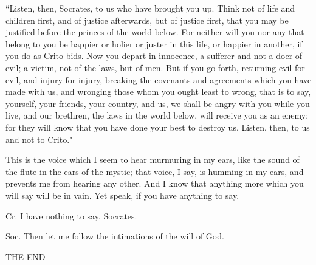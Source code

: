 ``Listen, then, Socrates, to us who have brought you up. Think not
of life and children first, and of justice afterwards, but of justice
first, that you may be justified before the princes of the world below.
For neither will you nor any that belong to you be happier or holier
or juster in this life, or happier in another, if you do as Crito
bids. Now you depart in innocence, a sufferer and not a doer of evil;
a victim, not of the laws, but of men. But if you go forth, returning
evil for evil, and injury for injury, breaking the covenants and agreements
which you have made with us, and wronging those whom you ought least
to wrong, that is to say, yourself, your friends, your country, and
us, we shall be angry with you while you live, and our brethren, the
laws in the world below, will receive you as an enemy; for they will
know that you have done your best to destroy us. Listen, then, to
us and not to Crito." 

This is the voice which I seem to hear murmuring in my ears, like
the sound of the flute in the ears of the mystic; that voice, I say,
is humming in my ears, and prevents me from hearing any other. And
I know that anything more which you will say will be in vain. Yet
speak, if you have anything to say. 

Cr. I have nothing to say, Socrates. 

Soc. Then let me follow the intimations of the will of God.

THE END

